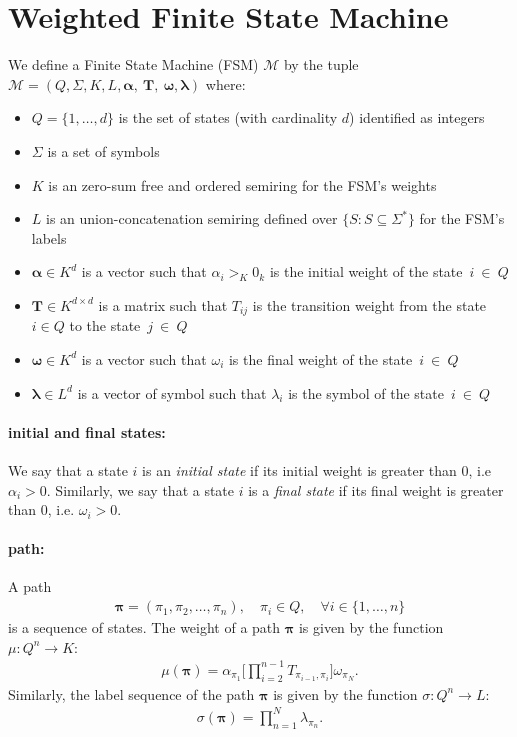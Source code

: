 \section{Weighted Finite State Machine}

We define a Finite State Machine (FSM) $\mathcal{M}$ by the tuple
$\mathcal{M} = (Q, \Sigma, K, L, \boldsymbol{\alpha},~\mathbf{T},~\boldsymbol{\omega}, \boldsymbol{\lambda})$
where:
\begin{itemize}
    \item $Q = \{1, \dots, d\}$ is the set of states (with cardinality $d$)
        identified as integers
    \item $\Sigma$ is a set of symbols
    \item $K$ is an zero-sum free and ordered semiring for the FSM's weights
    \item $L$ is an union-concatenation semiring defined over $\{ S : S \subseteq \Sigma^* \}$ for the FSM's labels
    \item $\boldsymbol{\alpha} \in K^d$ is a vector such that $\alpha_i >_K 0_k$
    is the initial weight of the state~$i~\in~Q$
    \item $\mathbf{T} \in K^{d\times d}$ is a matrix such that $T_{ij}$
        is the transition weight from the state $i \in Q$ to the state~$j~\in~Q$
    \item $\boldsymbol{\omega} \in K^d$ is a vector such that $\omega_i$
        is the final weight of the state~$i~\in~Q$
    \item $\boldsymbol{\lambda} \in L^d$ is a vector of symbol such that
        $\lambda_i$ is the symbol of the state~$i~\in~Q$
\end{itemize}

\paragraph{initial and final states:} We say that a state $i$ is an
\emph{initial state} if its initial weight is greater than $0$,
i.e $\alpha_i > 0$. Similarly, we say that a state $i$ is a
\emph{final state} if its final weight is greater than $0$, i.e.
$\omega_i > 0$.

\paragraph{path:} A path
\begin{align}
    \boldsymbol{\pi} = (\pi_1, \pi_2, \dots, \pi_n), \quad
        \pi_i \in Q, \quad \forall i \in \{1, \dots, n \}
\end{align}
is a sequence of states. The weight of a path $\boldsymbol{\pi}$ is
given by the function $\mu: Q^n \rightarrow K$:
\begin{align}
    \mu(\boldsymbol{\pi}) = \alpha_{\pi_1} \Big[
        \prod_{i=2}^{n-1} T_{\pi_{i-1},\pi_i} \Big] \omega_{\pi_N}.
\end{align}
Similarly, the label sequence of the path $\boldsymbol{\pi}$ is given
by the function $\sigma: Q^n \rightarrow L$:
\begin{align}
    \sigma(\boldsymbol{\pi}) = \prod_{n=1}^N \lambda_{\pi_n}.
\end{align}

